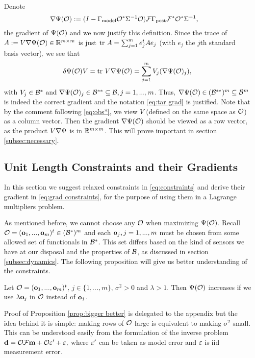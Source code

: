 \documentclass{amsart}
\numberwithin{equation}{section}
\begin{document}
Denote
\begin{align}\label{eq:tar grad}
  \nabla \Psi(\mathcal{O}) &:= (I - \Gamma_{\textup{model}} \mathcal{O}^* \Sigma^{-1} \mathcal{O}) \mathcal{F}
  \Gamma_{\textup{post}} \mathcal{F}^* \mathcal{O}^*\Sigma^{-1},
\end{align}
the gradient of $\Psi (\mathcal{O} )$ and we now justify this definition.
Since the trace of $A := V \nabla \Psi(\mathcal{O}) \in \mathbb{R}^{m \times m}$ is
just $\textup{tr}\  A = \sum_{j=1}^m e_j^t A e_j$ (with $e_j$ the $j$th standard
basis vector), we see that
\begin{align*}
  \delta \Psi(\mathcal{O})V = \textup{tr}\  V \nabla \Psi(\mathcal{O}) = \sum_{j=1}^m
  V_j(\nabla \Psi(\mathcal{O})_j),
\end{align*}
with $V_j \in \mathcal{B}^*$ and $\nabla \Psi(\mathcal{O})_j \in \mathcal{B}^{**}\subseteq
\mathcal{B}, j=1,...,m$. Thus, $\nabla \Psi( \mathcal{O} ) \in (\mathcal{B}^{**})^m
\subseteq \mathcal{B}^m$ is indeed the correct gradient and the notation
\eqref{eq:tar grad} is justified. Note that by the comment following
\eqref{eq:obs*}, we view $V$ (defined on the same space as $\mathcal{O}$) as
a column vector. Then the gradient $\nabla \Psi(\mathcal{O})$ should be
viewed as a row vector, as the product $V \nabla \Psi$ is in $\mathbb{R}^{m
  \times m}$. This will prove important in section
\ref{subsec:necessary}.

\subsection{Unit Length Constraints and their Gradients}\label{subsec:unit length}
In this section we suggest relaxed constraints in
\eqref{eq:constraints} and derive their gradient in \eqref{eq:grad
  constraints}, for the purpose of using them in a Lagrange
multipliers problem.

As mentioned before, we cannot choose any $\mathcal{O}$ when maximizing
$\Psi(\mathcal{O})$. Recall $\mathcal{O} = (\mathbf{o}_1,...,\mathbf{o}_m)^t \in (\mathcal{B}^*)^m$
and each $\mathbf{o}_j,j=1,...,m$ must be chosen from some allowed set of
functionals in $\mathcal{B}^*$. This set differs based on the kind of sensors
we have at our disposal and the properties of $\mathcal{B}$, as discussed in
section \ref{subsec:dynamics}. The following proposition will give us
better understanding of the constraints. 
\begin{proposition}\label{prop:bigger better}
  Let $\mathcal{O} = (\mathbf{o}_1,...,\mathbf{o}_m)^t$, $j \in \{1,...,m\}$, $\sigma^2
  > 0$ and $\lambda > 1$. Then $\Psi(\mathcal{O})$ increases if we use
  $\lambda \mathbf{o}_j$ in $\mathcal{O}$ instead of $\mathbf{o}_j$.
\end{proposition}
Proof of Proposition \ref{prop:bigger better} is delegated to the
appendix but the idea behind it is simple: making rows of $\mathcal{O}$ large
is equivalent to making $\sigma^2$ small. This can be understood
easily from the formulation of the inverse problem $\mathbf{d} = \mathcal{O} \mathcal{F}
\mathbf{m} + \mathcal{O} \varepsilon' + \varepsilon$, where $\varepsilon'$ can be taken as model error
and $\varepsilon$ is iid measurement error.
\end{document}
